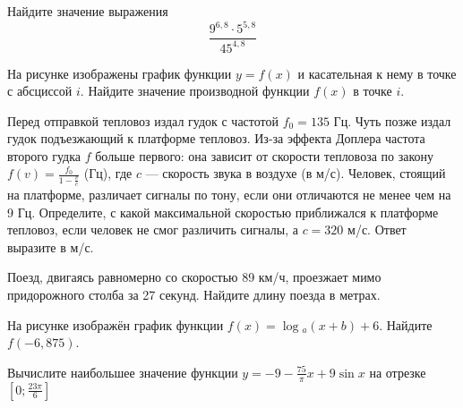 \begin{taskBN}{6}
Найдите значение выражения $$\frac{9^{6,8}\cdot{5^{5,8}}}{45^{4,8}}$$
\end{taskBN}

\begin{taskBN}{7}
    На рисунке изображены график функции $y = f(x)$ и касательная к нему в точке с абсциссой $i$. Найдите значение производной функции $f(x)$ в точке $i$.
\end{taskBN}

\begin{taskBN}{8}
Перед отправкой тепловоз издал гудок с частотой $f_0 = 135$ Гц. Чуть позже издал гудок подъезжающий к платформе тепловоз. Из-за эффекта Доплера частота второго гудка $f$ больше первого: она зависит от скорости тепловоза по закону $f(v)=\frac{f_0}{1-\frac{v}{c}}$ (Гц), где $c$ — скорость звука в воздухе (в м/с). Человек, стоящий на платформе, различает сигналы по тону, если они отличаются не менее чем на 9 Гц. Определите, с какой максимальной скоростью приближался к платформе тепловоз, если человек не смог различить сигналы, а $c = 320$ м/с. Ответ выразите в м/с.
\end{taskBN}

\begin{taskBN}{9}
Поезд, двигаясь равномерно со скоростью 89 км/ч, проезжает мимо придорожного столба за 27 секунд. Найдите длину поезда в метрах.
\end{taskBN}

\begin{taskBN}{10}
На рисунке изображён график функции $f(x)=\log{_a}{(x+b)}+6$. Найдите $f(-6,875)$. 
\end{taskBN}

\begin{taskBN}{11}
Вычислите наибольшее значение функции $y = -9-\frac{75}{\pi}x+9\sin x$ на отрезке $\left[0;\frac{23\pi}{6} \right]$
\end{taskBN}



